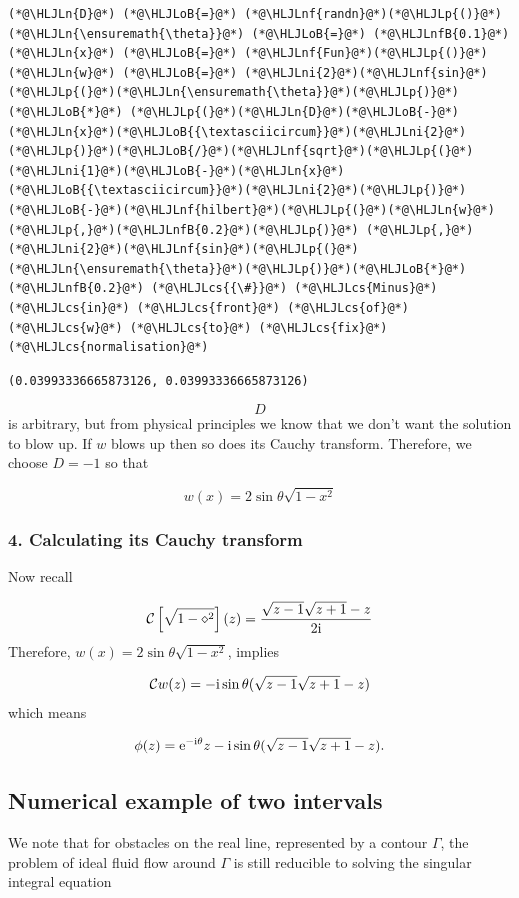 \documentclass[12pt,a4paper]{article}
\newcommand{\HLJLn}[1]{#1}
\newcommand{\HLJLnf}[1]{\textcolor[RGB]{66,102,213}{#1}}
\newcommand{\HLJLnfB}[1]{\textcolor[RGB]{59,151,46}{#1}}
\newcommand{\HLJLni}[1]{\textcolor[RGB]{59,151,46}{#1}}
\newcommand{\HLJLoB}[1]{\textcolor[RGB]{102,102,102}{\textbf{#1}}}
\newcommand{\HLJLp}[1]{#1}
\newcommand{\HLJLcs}[1]{\textcolor[RGB]{153,153,119}{\textit{#1}}}
\def\I{ {\rm i} }
\def\E{ {\rm e} }
\def\CC{ {\cal C} }
\begin{document}
\begin{lstlisting}
(*@\HLJLn{D}@*) (*@\HLJLoB{=}@*) (*@\HLJLnf{randn}@*)(*@\HLJLp{()}@*)
(*@\HLJLn{\ensuremath{\theta}}@*) (*@\HLJLoB{=}@*) (*@\HLJLnfB{0.1}@*)
(*@\HLJLn{x}@*) (*@\HLJLoB{=}@*) (*@\HLJLnf{Fun}@*)(*@\HLJLp{()}@*)
(*@\HLJLn{w}@*) (*@\HLJLoB{=}@*) (*@\HLJLni{2}@*)(*@\HLJLnf{sin}@*)(*@\HLJLp{(}@*)(*@\HLJLn{\ensuremath{\theta}}@*)(*@\HLJLp{)}@*) (*@\HLJLoB{*}@*) (*@\HLJLp{(}@*)(*@\HLJLn{D}@*)(*@\HLJLoB{-}@*)(*@\HLJLn{x}@*)(*@\HLJLoB{{\textasciicircum}}@*)(*@\HLJLni{2}@*)(*@\HLJLp{)}@*)(*@\HLJLoB{/}@*)(*@\HLJLnf{sqrt}@*)(*@\HLJLp{(}@*)(*@\HLJLni{1}@*)(*@\HLJLoB{-}@*)(*@\HLJLn{x}@*)(*@\HLJLoB{{\textasciicircum}}@*)(*@\HLJLni{2}@*)(*@\HLJLp{)}@*)
(*@\HLJLoB{-}@*)(*@\HLJLnf{hilbert}@*)(*@\HLJLp{(}@*)(*@\HLJLn{w}@*)(*@\HLJLp{,}@*)(*@\HLJLnfB{0.2}@*)(*@\HLJLp{)}@*) (*@\HLJLp{,}@*) (*@\HLJLni{2}@*)(*@\HLJLnf{sin}@*)(*@\HLJLp{(}@*)(*@\HLJLn{\ensuremath{\theta}}@*)(*@\HLJLp{)}@*)(*@\HLJLoB{*}@*)(*@\HLJLnfB{0.2}@*) (*@\HLJLcs{{\#}}@*) (*@\HLJLcs{Minus}@*) (*@\HLJLcs{in}@*) (*@\HLJLcs{front}@*) (*@\HLJLcs{of}@*) (*@\HLJLcs{w}@*) (*@\HLJLcs{to}@*) (*@\HLJLcs{fix}@*) (*@\HLJLcs{normalisation}@*)
\end{lstlisting}

\begin{lstlisting}
(0.03993336665873126, 0.03993336665873126)
\end{lstlisting}


\[
D
\]
is arbitrary, but from physical principles we know that we don't want the solution to blow up.  If $w$ blows up then so does its Cauchy transform. Therefore, we choose $D = -1$ so that

\[
w(x) = 2 \sin \theta \sqrt{1-x^2}
\]
\subsubsection{4. Calculating its Cauchy transform}
Now recall

\[
\CC\left[{\sqrt{1-\diamond^2}}\right](z) = {\sqrt{z-1} \sqrt{z+1} -z \over 2 \I}
\]
Therefore, $w(x) = 2 \sin \theta \sqrt{1-x^2}$,  implies

\[
\CC w(z) = - \I \sin \theta (\sqrt{z-1} \sqrt{z+1} -z)
\]
which means

\[
\phi(z) = \E^{-\I \theta} z - \I \sin \theta (\sqrt{z-1} \sqrt{z+1} -z).
\]
\subsection{Numerical example of two intervals}
We note that for obstacles on the real line, represented by a contour $\Gamma$, the problem of ideal fluid  flow around $\Gamma$ is still reducible to solving the singular integral equation
\end{document}
